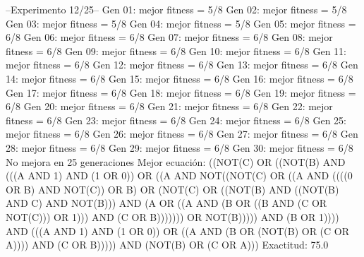 --Experimento 
 12/25--
Gen 01: mejor fitness = 5/8
Gen 02: mejor fitness = 5/8
Gen 03: mejor fitness = 5/8
Gen 04: mejor fitness = 5/8
Gen 05: mejor fitness = 6/8
Gen 06: mejor fitness = 6/8
Gen 07: mejor fitness = 6/8
Gen 08: mejor fitness = 6/8
Gen 09: mejor fitness = 6/8
Gen 10: mejor fitness = 6/8
Gen 11: mejor fitness = 6/8
Gen 12: mejor fitness = 6/8
Gen 13: mejor fitness = 6/8
Gen 14: mejor fitness = 6/8
Gen 15: mejor fitness = 6/8
Gen 16: mejor fitness = 6/8
Gen 17: mejor fitness = 6/8
Gen 18: mejor fitness = 6/8
Gen 19: mejor fitness = 6/8
Gen 20: mejor fitness = 6/8
Gen 21: mejor fitness = 6/8
Gen 22: mejor fitness = 6/8
Gen 23: mejor fitness = 6/8
Gen 24: mejor fitness = 6/8
Gen 25: mejor fitness = 6/8
Gen 26: mejor fitness = 6/8
Gen 27: mejor fitness = 6/8
Gen 28: mejor fitness = 6/8
Gen 29: mejor fitness = 6/8
Gen 30: mejor fitness = 6/8
No mejora en 25 generaciones
Mejor ecuación: ((NOT(C) OR ((NOT(B) AND (((A AND 1) AND (1 OR 0)) OR ((A AND NOT((NOT(C) OR ((A AND ((((0 OR B) AND NOT(C)) OR B) OR (NOT(C) OR ((NOT(B) AND ((NOT(B) AND C) AND NOT(B))) AND (A OR ((A AND (B OR ((B AND (C OR NOT(C))) OR 1))) AND (C OR B))))))) OR NOT(B))))) AND (B OR 1)))) AND (((A AND 1) AND (1 OR 0)) OR ((A AND (B OR (NOT(B) OR (C OR A)))) AND (C OR B))))) AND (NOT(B) OR (C OR A)))
 Exactitud: 75.0%

